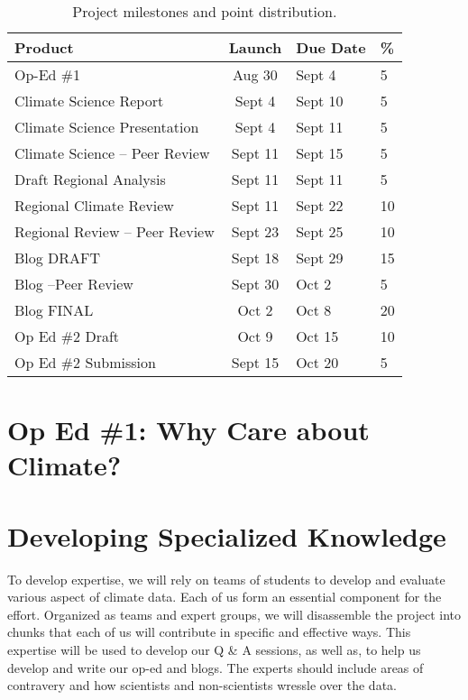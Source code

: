 \documentclass{article}\usepackage[]{graphicx}\usepackage[]{color}
\begin{document}
\begin{table}[h]

\caption{Project milestones and point distribution.}\label{tab:milestones}
\begin{tabular}{lcll}\hline
Product                     & Launch    & Due Date  & \% \\\hline\hline
Op-Ed \#1                   & Aug 30    & Sept 4    & 5 \\
Climate Science Report      & Sept 4    & Sept 10   & 5 \\
Climate Science Presentation& Sept 4    & Sept 11   & 5 \\
Climate Science -- Peer Review  & Sept 11 & Sept 15 & 5 \\
Draft Regional Analysis     & Sept 11   & Sept 11   & 5 \\
Regional Climate Review     & Sept 11   & Sept 22   & 10 \\
Regional Review -- Peer Review & Sept 23   & Sept 25 & 10 \\
Blog DRAFT                  & Sept 18   & Sept 29    & 15 \\
Blog --Peer Review          & Sept 30   & Oct 2     & 5\\
Blog FINAL                  & Oct 2     & Oct 8    & 20 \\
Op Ed \#2 Draft             & Oct 9     & Oct 15    & 10 \\
Op Ed \#2 Submission        & Sept 15   & Oct 20    & 5 \\ \hline
\end{tabular}
\end{table}

\section{Op Ed \#1: Why Care about Climate?}



\section{Developing Specialized Knowledge}

To develop expertise, we will rely on teams of students to develop and evaluate various aspect of climate data. Each of us form an essential component for the effort. Organized as teams and expert groups, we will disassemble the project into chunks that each of us will contribute in specific and effective ways. This expertise will be used to develop our Q \& A sessions, as well as, to help us develop and write our op-ed and blogs. The experts should include areas of contravery and how scientists and non-scientists wressle over the data.
\end{document}
